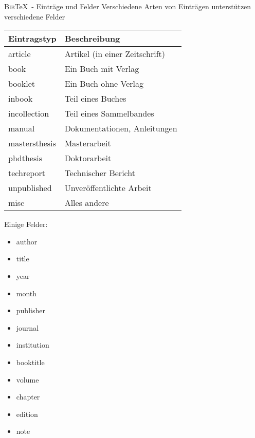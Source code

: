 \documentclass[aspectratio=169]{beamer}
\providecommand{\tightlist}{\setlength{\itemsep}{0pt}\setlength{\parskip}{0pt}}
\newcommand\citestyle[1]{\textcolor{foreground-secondary}{\textsuperscript{#1}}}
\let\oldcite=\cite
\renewcommand{\cite}[1]{\citestyle{\oldcite{#1}}}
\let\oldautocite\autocite
\renewcommand{\autocite}[1]{\citestyle{\oldautocite{#1}}}
\begin{document}
    \begin{frame}{\textsc{Bib}\TeX~- Einträge und Felder}
    \protect\hypertarget{eintruxe4ge-und-felder}{}
    Verschiedene Arten von Einträgen unterstützen verschiedene Felder
    \autocite{bibtex}

    \begin{minipage}{0.66\textwidth}

    \begin{longtable}[]{@{}ll@{}}
    \toprule()
    Eintragstyp & Beschreibung \\
    \midrule()
    \endhead
    article & Artikel (in einer Zeitschrift) \cite{bibtex} \\
    book & Ein Buch mit Verlag \cite{bibtex} \\
    booklet & Ein Buch ohne Verlag \cite{bibtex} \\
    inbook & Teil eines Buches \cite{bibtex} \\
    incollection & Teil eines Sammelbandes \cite{bibtex} \\
    manual & Dokumentationen, Anleitungen \cite{bibtex} \\
    mastersthesis & Masterarbeit \cite{bibtex} \\
    phdthesis & Doktorarbeit \cite{bibtex} \\
    techreport & Technischer Bericht \cite{bibtex} \\
    unpublished & Unveröffentlichte Arbeit \cite{bibtex} \\
    misc & Alles andere \cite{bibtex} \\
    \bottomrule()
    \end{longtable}

    \end{minipage}\begin{minipage}{0.33\textwidth}

    \phantom{m}Einige Felder: \autocite{bibtex}

    \begin{itemize}
    \tightlist
    \item
      author
    \item
      title
    \item
      year
    \item
      month
    \item
      publisher
    \item
      journal
    \item
      institution
    \item
      booktitle
    \item
      volume
    \item
      chapter
    \item
      edition
    \item
      note
    \end{itemize}

    \vfill

    \end{minipage}
    \end{frame}
\end{document}
